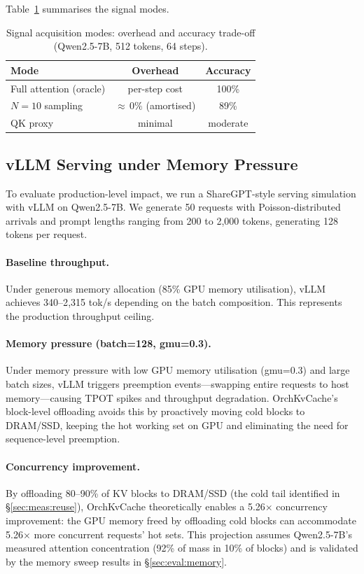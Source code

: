 \documentclass[acmsmall,nonacm,screen]{acmart}
\newcommand{\sys}{OrchKvCache}
\begin{document}
Table~\ref{tab:signal_overhead} summarises the signal modes.

\begin{table}[t]
\centering
\caption{Signal acquisition modes: overhead and accuracy trade-off
(Qwen2.5-7B, 512 tokens, 64 steps).}
\label{tab:signal_overhead}
\begin{tabular}{lcc}
\toprule
\textbf{Mode} & \textbf{Overhead} & \textbf{Accuracy} \\
\midrule
Full attention (oracle) & per-step cost & 100\% \\
$N{=}10$ sampling       & ${\approx}\,0\%$ (amortised) & 89\% \\
QK proxy                & minimal & moderate \\
\bottomrule
\end{tabular}
\end{table}

\subsection{vLLM Serving under Memory Pressure}\label{sec:eval:vllm}

To evaluate production-level impact, we run a ShareGPT-style serving
simulation with vLLM on Qwen2.5-7B.  We generate 50 requests with
Poisson-distributed arrivals and prompt lengths ranging from 200 to 2{,}000
tokens, generating 128 tokens per request.

\paragraph{Baseline throughput.}
Under generous memory allocation (85\% GPU memory utilisation), vLLM
achieves 340--2{,}315 tok/s depending on the batch composition.  This
represents the production throughput ceiling.

\paragraph{Memory pressure (batch=128, gmu=0.3).}
Under memory pressure with low GPU memory utilisation (gmu=0.3) and
large batch sizes, vLLM triggers preemption events---swapping entire
requests to host memory---causing TPOT spikes and throughput degradation.
\sys{}'s block-level offloading avoids this by proactively moving cold
blocks to DRAM/SSD, keeping the hot working set on GPU and eliminating
the need for sequence-level preemption.

\paragraph{Concurrency improvement.}
By offloading 80--90\% of KV blocks to DRAM/SSD (the cold tail identified
in \S\ref{sec:meas:reuse}), \sys{} theoretically enables a 5.26$\times$
concurrency improvement: the GPU memory freed by offloading cold blocks
can accommodate 5.26$\times$ more concurrent requests' hot sets.  This
projection assumes Qwen2.5-7B's measured attention concentration (92\% of
mass in 10\% of blocks) and is validated by the memory sweep results
in \S\ref{sec:eval:memory}.
\end{document}
